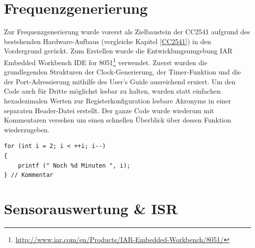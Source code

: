 \documentclass[12pt]{scrreprt} %
\begin{document}
\section{Frequenzgenerierung}
Zur Frequenzgenerierung wurde vorerst als Zielbaustein der CC2541 aufgrund des bestehenden Hardware-Aufbaus (vergleiche Kapitel \vref{CC2541}) in den Vordergrund gerückt. Zum Erstellen wurde die Entwicklungsumgebung IAR Embedded Workbench IDE for 8051\footnote{\url{http://www.iar.com/en/Products/IAR-Embedded-Workbench/8051/}} verwendet. Zuerst wurden die grundlegenden Strukturen der Clock-Generierung, der Timer-Funktion und die der Port-Adressierung mithilfe des User's Guide \citep{CC2541_full} ausreichend eruiert. Um den Code auch für Dritte möglichst lesbar zu halten, wurden statt einfachen hexadezimalen Werten zur Registerkonfiguration lesbare Akronyme in einer separaten Header-Datei erstellt. Der ganze Code wurde wiederum mit Kommentaren versehen um einen schnellen Überblick über dessen Funktion wiederzugeben. 

\begin {lstlisting}
for (int i = 2; i < ++i; i--)
{
	printf (" Noch %
} // Kommentar
\end{lstlisting}

\section{Sensorauswertung \& ISR}



\end{document}
